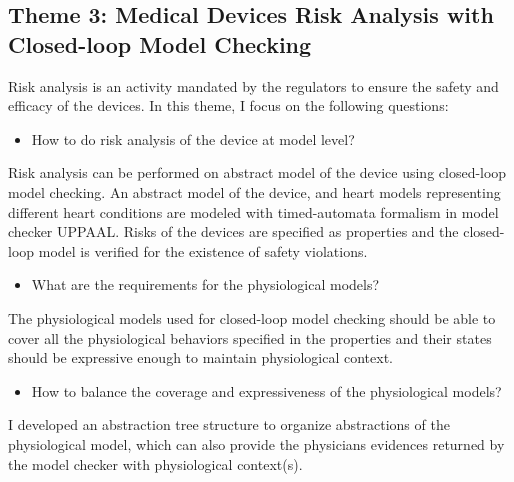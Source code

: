 \documentclass[a4paper]{article}
\begin{document}
\subsection*{Theme 3: Medical Devices Risk Analysis with Closed-loop Model Checking}
Risk analysis is an activity mandated by the regulators to ensure the safety and efficacy of the devices.
In this theme, I focus on the following questions:
\begin{itemize}
\item How to do risk analysis of the device at model level?
\end{itemize}
Risk analysis can be performed on abstract model of the device using closed-loop model checking.
An abstract model of the device, and heart models representing different heart conditions are modeled with timed-automata formalism in model checker UPPAAL.
Risks of the devices are specified as properties and the closed-loop model is verified for the existence of safety violations.
\begin{itemize}
\item What are the requirements for the physiological models?
\end{itemize}
The physiological models used for closed-loop model checking should be able to cover all the physiological behaviors specified in the properties and their states should be expressive enough to maintain physiological context.
\begin{itemize}
\item How to balance the coverage and expressiveness of the physiological models?
\end{itemize}
I developed an abstraction tree structure to organize abstractions of the physiological model, which can also provide the physicians evidences returned by the model checker with physiological context(s).
\end{document}
